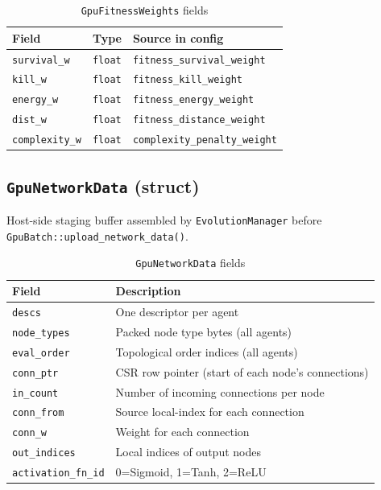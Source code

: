 \begin{table}[H]
\centering\small
\caption{\texttt{GpuFitnessWeights} fields}
\begin{tabular}{@{}lll@{}}
\toprule
\textbf{Field} & \textbf{Type} & \textbf{Source in config} \\
\midrule
\texttt{survival\_w}  & \texttt{float} & \texttt{fitness\_survival\_weight} \\
\texttt{kill\_w}      & \texttt{float} & \texttt{fitness\_kill\_weight} \\
\texttt{energy\_w}    & \texttt{float} & \texttt{fitness\_energy\_weight} \\
\texttt{dist\_w}      & \texttt{float} & \texttt{fitness\_distance\_weight} \\
\texttt{complexity\_w}& \texttt{float} & \texttt{complexity\_penalty\_weight} \\
\bottomrule
\end{tabular}
\end{table}

\subsection{\texttt{GpuNetworkData} (struct)}

Host-side staging buffer assembled by \texttt{EvolutionManager} before
\texttt{GpuBatch::upload\_network\_data()}.

\begin{table}[H]
\centering\small
\caption{\texttt{GpuNetworkData} fields}
\begin{tabularx}{\textwidth}{@{}lX@{}}
\toprule
\textbf{Field} & \textbf{Description} \\
\midrule
\texttt{descs}           & One descriptor per agent \\
\texttt{node\_types}     & Packed node type bytes (all agents) \\
\texttt{eval\_order}     & Topological order indices (all agents) \\
\texttt{conn\_ptr}       & CSR row pointer (start of each node's connections) \\
\texttt{in\_count}       & Number of incoming connections per node \\
\texttt{conn\_from}      & Source local-index for each connection \\
\texttt{conn\_w}         & Weight for each connection \\
\texttt{out\_indices}    & Local indices of output nodes \\
\texttt{activation\_fn\_id} & 0=Sigmoid, 1=Tanh, 2=ReLU \\
\bottomrule
\end{tabularx}
\end{table}

